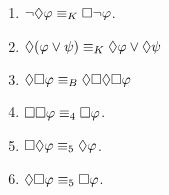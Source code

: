 \documentclass[a4paper, 11pt]{article}                  %
\begin{document}
\begin{enumerate}
	\item $\neg\Diamond \metaA \MLequiv[K] \Box\neg \metaA$.

	\item $\Diamond(\metaA \vee \metaB) \MLequiv[K]  \Diamond\metaA \vee \Diamond\metaB$

	\item $\Diamond\Box \metaA \MLequiv[B] \Diamond\Box\Diamond\Box\metaA$

	\item $\Box\Box \metaA \MLequiv[4] \Box \metaA$.

	\item $\Box\Diamond \metaA \MLequiv[5] \Diamond \metaA$.

	\item $\Diamond\Box \metaA \MLequiv[5] \Box \metaA$.

\end{enumerate}



\end{document}
